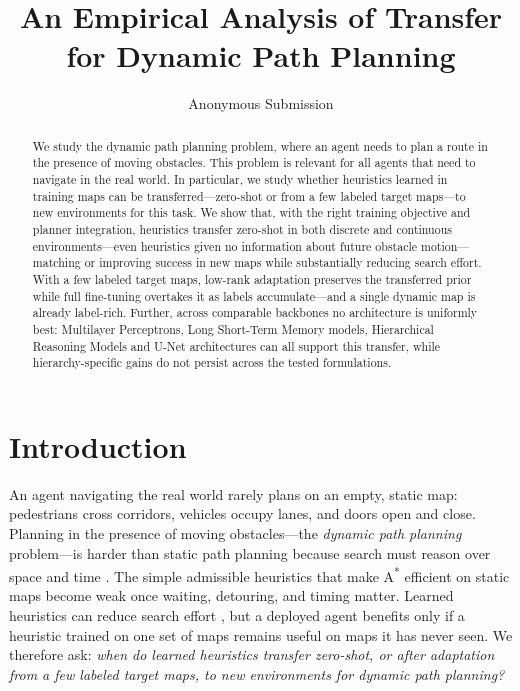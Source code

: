 \documentclass[letterpaper]{article} %
\title{An Empirical Analysis of Transfer for Dynamic Path Planning}
\author{
    Anonymous Submission
}
\begin{document}
\maketitle

\begin{abstract}
We study the dynamic path planning problem, where an agent needs to plan a route in the presence of moving obstacles. This problem is relevant for all agents that need to navigate in the real world. In particular, we study whether heuristics learned in training maps can be transferred---zero-shot or from a few labeled target maps---to new environments for this task. We show that, with the right training objective and planner integration, heuristics transfer zero-shot in both discrete and continuous environments---even heuristics given no information about future obstacle motion---matching or improving success in new maps while substantially reducing search effort. With a few labeled target maps, low-rank adaptation preserves the transferred prior while full fine-tuning overtakes it as labels accumulate---and a single dynamic map is already label-rich. Further, across comparable backbones no architecture is uniformly best: Multilayer Perceptrons, Long Short-Term Memory models, Hierarchical Reasoning Models and U-Net architectures can all support this transfer, while hierarchy-specific gains do not persist across the tested formulations.
\end{abstract}


\section{Introduction}

An agent navigating the real world rarely plans on an empty, static map: pedestrians cross corridors, vehicles occupy lanes, and doors open and close. Planning in the presence of moving obstacles---the \emph{dynamic path planning} problem---is harder than static path planning because search must reason over space and time \citep{silver2005cooperative,phillips2011sipp}. The simple admissible heuristics that make A\textsuperscript{*} \citep{hart1968astar} efficient on static maps become weak once waiting, detouring, and timing matter. Learned heuristics can reduce search effort \citep{arfaee2011bootstrap,bhardwaj2017sail,yonetani2021neuralastar}, but a deployed agent benefits only if a heuristic trained on one set of maps remains useful on maps it has never seen. We therefore ask: \emph{when do learned heuristics transfer zero-shot, or after adaptation from a few labeled target maps, to new environments for dynamic path planning?}
\end{document}
